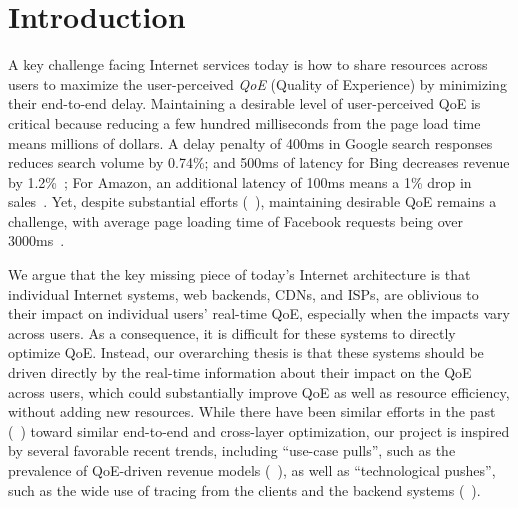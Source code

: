 
\section{Introduction}

\noindent A key challenge facing Internet services today is how to share resources across users to maximize the user-perceived {\em QoE} (Quality of Experience) by minimizing their end-to-end delay.
Maintaining a desirable level of user-perceived QoE is critical because reducing a few hundred milliseconds from the page load time means millions of dollars.
A delay penalty of 400ms in Google search responses reduces search volume by 0.74\%; and 500ms of latency for Bing decreases revenue by 1.2\%~\cite{google-revenue,bing-revenue}; For Amazon, an additional latency of 100ms means a 1\% drop in sales~\cite{amazon-revenue}.
Yet, despite substantial efforts (\eg~\cite{shandian,gaze,rosen2017push,jalaparti2013speeding}), maintaining desirable QoE remains a challenge, with average page loading time of Facebook requests being over 3000ms~\cite{mystery}.

We argue that the key missing piece of today's Internet architecture is that individual Internet systems, \eg web backends, CDNs, and ISPs, are oblivious to their impact on individual users' real-time QoE, especially when the impacts vary across users.
As a consequence, it is difficult for these systems to directly optimize QoE. 
Instead, our overarching thesis is that these systems should be driven directly by the real-time information about their impact on the QoE across users, which could substantially improve QoE as well as resource efficiency, without adding new resources.
While there have been similar efforts in the past (\eg~\cite{alto,frank2013pushing,xie2008p4p,jiang2009cooperative}) toward similar end-to-end and cross-layer optimization, our project is inspired by several favorable recent trends, including ``use-case pulls'', such as the prevalence of QoE-driven revenue models (\eg~\cite{akamai-report,dobrian2011understanding}), as well as ``technological pushes'', such as the wide use of tracing from the clients and the backend systems (\eg~\cite{mystery,zhao2014lprof}). 

